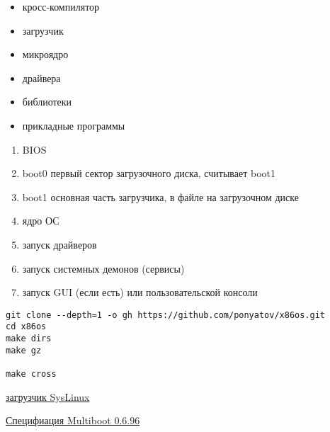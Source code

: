 
\begin{itemize}
  \item кросс-компилятор
  \item загрузчик
  \item микроядро
  \item драйвера
  \item библиотеки
  \item прикладные программы
\end{itemize}


\begin{enumerate}
  \item BIOS
  \item boot0 первый сектор загрузочного диска, считывает boot1
  \item boot1 основная часть загрузчика, в файле на загрузочном диске
  \item ядро ОС
  \item запуск драйверов
  \item запуск системных демонов (сервисы)
  \item запуск GUI (если есть) или пользовательской консоли
\end{enumerate}


\begin{verbatim}
git clone --depth=1 -o gh https://github.com/ponyatov/x86os.git
cd x86os 
make dirs
make gz

make cross
\end{verbatim}



\href{http://www.syslinux.org/}{загрузчик SysLinux}

\href{http://www.gnu.org/software/grub/manual/multiboot/multiboot.html}{Специфиация
Multiboot 0.6.96}

\secdown



\secdown
{}
\secup

\secup

\secup
